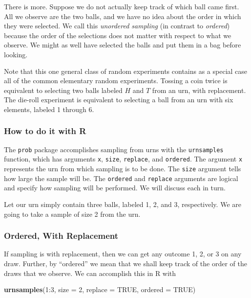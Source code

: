 \documentclass[]{book}
\newenvironment{Shaded}{\begin{snugshade}}{\end{snugshade}}
\newcommand{\KeywordTok}[1]{\textcolor[rgb]{0.13,0.29,0.53}{\textbf{{#1}}}}
\newcommand{\DataTypeTok}[1]{\textcolor[rgb]{0.13,0.29,0.53}{{#1}}}
\newcommand{\DecValTok}[1]{\textcolor[rgb]{0.00,0.00,0.81}{{#1}}}
\newcommand{\OtherTok}[1]{\textcolor[rgb]{0.56,0.35,0.01}{{#1}}}
\newcommand{\NormalTok}[1]{{#1}}
\numberwithin{equation}{chapter}
\numberwithin{figure}{chapter}
\theoremstyle{plain}
\theoremstyle{definition}
\theoremstyle{remark}
\theoremstyle{definition}
\theoremstyle{definition}
\theoremstyle{remark}
\let\BeginKnitrBlock\begin \let\EndKnitrBlock\end
\begin{document}
There is more. Suppose we do not actually keep track of which ball came
first. All we observe are the two balls, and we have no idea about the
order in which they were selected. We call this \emph{unordered
sampling} (in contrast to \emph{ordered}) because the order of the
selections does not matter with respect to what we observe. We might as
well have selected the balls and put them in a bag before looking.

Note that this one general class of random experiments contains as a
special case all of the common elementary random experiments. Tossing a
coin twice is equivalent to selecting two balls labeled \(H\) and \(T\)
from an urn, with replacement. The die-roll experiment is equivalent to
selecting a ball from an urn with six elements, labeled 1 through 6.

\subsubsection{How to do it with R}\label{how-to-do-it-with-r-9}

The \texttt{prob} package \autocite{prob} accomplishes sampling from
urns with the \texttt{urnsamples} 
function, which has arguments \texttt{x}, \texttt{size},
\texttt{replace}, and \texttt{ordered}. The argument \texttt{x}
represents the urn from which sampling is to be done. The \texttt{size}
argument tells how large the sample will be. The \texttt{ordered} and
\texttt{replace} arguments are logical and specify how sampling will be
performed. We will discuss each in turn.

\bigskip

\BeginKnitrBlock{example}
\protect\hypertarget{ex:sample-urn-two-from-three}{}{\label{ex:sample-urn-two-from-three}}Let
our urn simply contain three balls, labeled 1, 2, and 3, respectively.
We are going to take a sample of size 2 from the urn.
\EndKnitrBlock{example}

\subsubsection{Ordered, With
Replacement}\label{ordered-with-replacement}

If sampling is with replacement, then we can get any outcome 1, 2, or 3
on any draw. Further, by ``ordered'' we mean that we shall keep track of
the order of the draws that we observe. We can accomplish this in R with

\begin{Shaded}
\begin{Highlighting}[]
\KeywordTok{urnsamples}\NormalTok{(}\DecValTok{1}\NormalTok{:}\DecValTok{3}\NormalTok{, }\DataTypeTok{size =} \DecValTok{2}\NormalTok{, }\DataTypeTok{replace =} \OtherTok{TRUE}\NormalTok{, }\DataTypeTok{ordered =} \OtherTok{TRUE}\NormalTok{)}
\end{Highlighting}
\end{Shaded}
\end{document}
